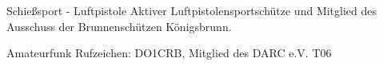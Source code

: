 


\begin{cvskills}


\cvskill
{Schießsport - Luftpistole}
{Aktiver Luftpistolensportschütze und Mitglied des Ausschuss der Brunnenschützen Königsbrunn. }

\cvskill
{Amateurfunk} %
{Rufzeichen: DO1CRB, Mitglied des DARC e.V. T06} %


\end{cvskills}
